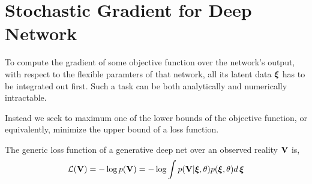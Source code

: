 \documentclass[11pt]{article} \usepackage{textcomp,bbding,subfig}
\begin{document}
\section{Stochastic Gradient for Deep Network}
To compute the gradient of some objective function over the network's output,
with respect to the flexible paramters of that network, all its latent data
$\boldsymbol{\xi}$ has to be integrated out first. Such a task can be both analytically
and numerically intractable.

Instead we seek to maximum one of the lower bounds of the objective function,
or equivalently, minimize the upper bound of a loss function.

The generic loss function of a generative deep net over an observed reality $\mathbf{V}$
is,
\begin{align*}
  \mathcal{L}(\mathbf{V}) = -\log p(\mathbf{V}) = -\log \int p(\mathbf{V}|\boldsymbol{\xi}, \theta) p(\boldsymbol{\xi}, \theta) d\,\boldsymbol{\xi}
\end{align*}

\singlespacing  
\end{document}
